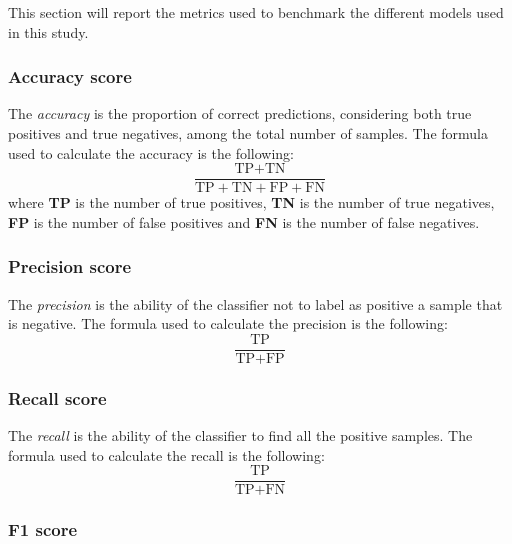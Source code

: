             This section will report the metrics used to benchmark the different models used in this study.

            \subsubsection{Accuracy score}

                The \textit{accuracy} is the proportion of correct predictions, considering both true positives and true negatives, among the total number of samples. The formula used to calculate the accuracy is the following:
                \begin{equation}
                    \frac{\text{TP} + \text{TN}}{\text{TP} + \text{TN} + \text{FP} + \text{FN}}
                \end{equation} 
                where \textbf{TP} is the number of true positives, \textbf{TN} is the number of true negatives, \textbf{FP} is the number of false positives and \textbf{FN} is the number of false negatives.

            \subsubsection{Precision score}

                The \textit{precision} is the ability of the classifier not to label as positive a sample that is negative. The formula used to calculate the precision is the following:
                \begin{equation}
                    \frac{\text{TP}}{\text{TP} + \text{FP}}
                \end{equation}

            \subsubsection{Recall score}

                The \textit{recall} is the ability of the classifier to find all the positive samples. The formula used to calculate the recall is the following:
                \begin{equation}
                    \frac{\text{TP}}{\text{TP} + \text{FN}}
                \end{equation}

            \subsubsection{F1 score}

